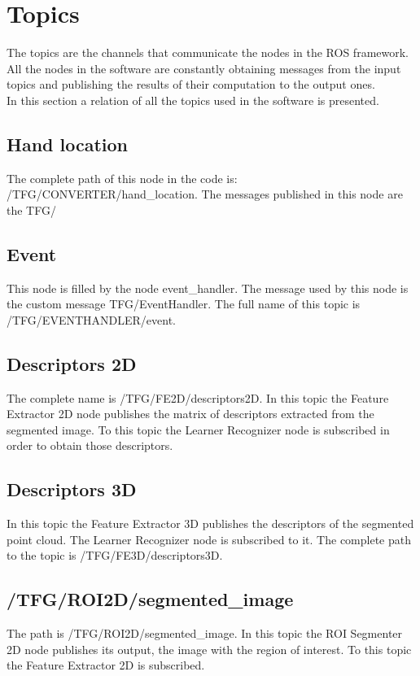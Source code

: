 \section{Topics}
\label{topics}

The topics are the channels that communicate the nodes in the ROS framework. All the nodes in the software are constantly obtaining messages from the input topics and publishing the results of their computation to the output ones. 
\\

In this section a relation of all the topics used in the software is presented. 


\subsection{Hand location}
The complete path of this node in the code is: /TFG/CONVERTER/hand\_location. The messages published in this node are the TFG/
\subsection{Event}
This node is filled by the node event\_handler. The message used by this node is the custom message TFG/EventHandler. The full name of this topic is /TFG/EVENTHANDLER/event. 

\subsection{Descriptors 2D}
The complete name is /TFG/FE2D/descriptors2D. In this topic the Feature Extractor 2D node publishes the matrix of descriptors extracted from the segmented image. To this topic the Learner Recognizer node is subscribed in order to obtain those descriptors.  

\subsection{Descriptors 3D}
In this topic the Feature Extractor 3D publishes the descriptors of the segmented point cloud. The Learner Recognizer node is subscribed to it. 
The complete path to the topic is /TFG/FE3D/descriptors3D.


\subsection{/TFG/ROI2D/segmented\_image}
The path  is /TFG/ROI2D/segmented\_image. In this topic the  ROI Segmenter 2D node publishes its output, the image with the region of interest. To this topic the Feature Extractor 2D is subscribed. 


